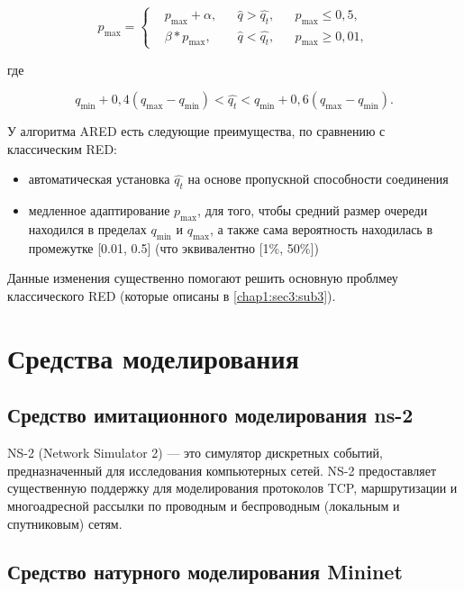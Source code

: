 \[
p_{\max} = \left\{
  \begin{aligned}
   & p_{\max}+\alpha, && \hat{q}>\hat{q_{t}}, && p_{\max} \leqslant 0,5, \\
   & \beta * p_{\max}, && \hat{q}<\hat{q_{t}}, && p_{\max} \geqslant 0,01, 
  \end{aligned}
\right.
\]

где

\[
q_{\min}+0,4\left(q_{\max}-q_{\min}\right) < \hat{q_t} < q_{\min}+0,6\left(q_{\max}-q_{\min}\right).
\]

У алгоритма ARED есть следующие преимущества, по сравнению с классическим RED:

\begin{itemize}

  \item автоматическая установка $\hat{q_t}$ на основе пропускной способности
    соединения

  \item медленное адаптирование $p_{\max}$, для того, чтобы средний размер
    очереди находился в пределах $q_{\min}$ и $q_{\max}$, а также сама
    вероятность находилась в промежутке [0.01, 0.5] (что эквивалентно [1\%,
    50\%])

\end{itemize}

Данные изменения существенно помогают решить основную проблмеу классического
RED (которые описаны в \ref{chap1:sec3:sub3}).


\section{Средства моделирования}
\label{chap1:sec3}

\subsection{Средство имитационного моделирования ns-2}
\label{chap1:sec3:sub1}

NS-2 (Network Simulator 2) --- это симулятор дискретных событий,
предназначенный для исследования компьютерных сетей. NS-2 предоставляет
существенную поддержку для моделирования протоколов TCP, маршрутизации и
многоадресной рассылки по проводным и беспроводным (локальным и спутниковым)
сетям.

\subsection{Средство натурного моделирования Mininet}
\label{chap1:sec3:sub2}

